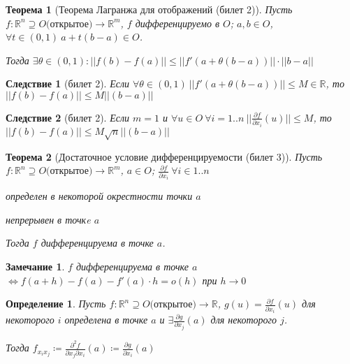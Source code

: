 \documentclass[11pt,a4paper,oneside]{scrartcl}
\newtheorem{definition}{Определение}
\newtheorem{theorem}{Теорема}
\newtheorem{consequence}{Следствие}
\newtheorem*{remark}{Замечание}
\begin{document}
\begin{theorem}[Теорема Лагранжа для отображений (билет 2)]    %
    Пусть $f: \mathbb{R}^n \supseteq O \text{(открытое)} \rightarrow \mathbb{R}^m$,
    $f$ дифференцируемо в $O$; $a, b \in O$, $\forall t \in (0, 1) \ a + t(b - a) \in O$.

    Тогда $\exists \theta \in (0, 1): ||f(b) - f(a)|| \leq ||f'(a + \theta(b - a))|| \cdot ||b-a||$
\end{theorem}

\setcounter{consequence}{0}
\begin{consequence}[билет 2]
    Если $\forall \theta \in (0, 1) \ ||f'(a + \theta(b - a))|| \leq M \in \mathbb{R}$,
    то $||f(b) - f(a)|| \leq M ||(b - a)||$
\end{consequence}
\begin{consequence}[билет 2]
    Если $m = 1$
    и $\forall u \in O \ \forall i = 1..n \ ||\frac{\partial f}{\partial x_i}(u)|| \leq M$,
    то $||f(b) - f(a)|| \leq M \sqrt{n} ||(b - a)||$
\end{consequence}

\begin{theorem}[Достаточное условие дифференцируемости (билет 3)]    %
    Пусть $f: \mathbb{R}^n \supseteq O \text{(открытое)} \rightarrow \mathbb{R}^m$, $a \in O$;
    $\frac{\partial f}{\partial x_i} \ \forall i \in 1..n$
    \begin{enumerate*} [label=\itshape\arabic*\upshape)]
        \item определен в некоторой окрестности точки $a$
        \item непрерывен в точкe $a$
    \end{enumerate*}

    Тогда $f$ дифференцируема в точке $a$.
\end{theorem}

\begin{remark}
    $f$ дифференцируема в точке $a$
    $\Leftrightarrow f(a + h) - f(a) - f'(a) \cdot h = o(h)$ при $h \rightarrow 0$
\end{remark}

\begin{definition}
    Пусть $f: \mathbb{R}^n \supseteq O \text{(открытое)} \rightarrow \mathbb{R}$,
    $g(u) = \frac{\partial f}{\partial x_i}(u)$ для некоторого $i$ определена в точке $a$
    и $\exists \frac{\partial g}{\partial x_j}(a)$ для некоторого $j$.

    Тогда $f_{x_i x_j} \coloneqq \frac{\partial^2 f}{\partial x_j \partial x_i}(a)
        \coloneqq \frac{\partial g}{\partial x_i}(a)$
\end{definition}
\end{document}
